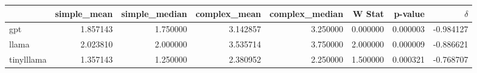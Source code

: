 \begin{tabular}{lrrrrrrr}
\toprule
 & simple_mean & simple_median & complex_mean & complex_median & W Stat & p-value & $\delta$ \\
\midrule
gpt & 1.857143 & 1.750000 & 3.142857 & 3.250000 & 0.000000 & 0.000003 & -0.984127 \\
llama & 2.023810 & 2.000000 & 3.535714 & 3.750000 & 2.000000 & 0.000009 & -0.886621 \\
tinylllama & 1.357143 & 1.250000 & 2.380952 & 2.250000 & 1.500000 & 0.000321 & -0.768707 \\
\bottomrule
\end{tabular}
